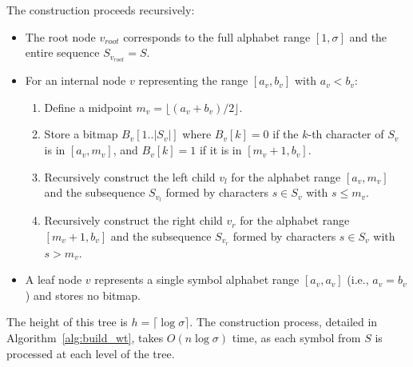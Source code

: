 The construction proceeds recursively:
\begin{itemize}
    \item The root node $v_{root}$ corresponds to the full alphabet range $[1, \sigma]$ and the entire sequence $S_{v_{root}} = S$.
    \item For an internal node $v$ representing the range $[a_v, b_v]$ with $a_v < b_v$:
          \begin{enumerate}
              \item Define a midpoint $m_v = \lfloor (a_v + b_v) / 2 \rfloor$.
              \item Store a bitmap $B_v[1..|S_v|]$ where $B_v[k] = 0$ if the $k$-th character of $S_v$ is in $[a_v, m_v]$, and $B_v[k] = 1$ if it is in $[m_v+1, b_v]$.
              \item Recursively construct the left child $v_l$ for the alphabet range $[a_v, m_v]$ and the subsequence $S_{v_l}$ formed by characters $s \in S_v$ with $s \le m_v$.
              \item Recursively construct the right child $v_r$ for the alphabet range $[m_v+1, b_v]$ and the subsequence $S_{v_r}$ formed by characters $s \in S_v$ with $s > m_v$.
          \end{enumerate}
    \item A leaf node $v$ represents a single symbol alphabet range $[a_v, a_v]$ (i.e., $a_v=b_v$) and stores no bitmap.
\end{itemize}
The height of this tree is $h = \lceil \log \sigma \rceil$. The construction process, detailed in Algorithm~\ref{alg:build_wt}, takes $O(n \log \sigma)$ time, as each symbol from $S$ is processed at each level of the tree.

